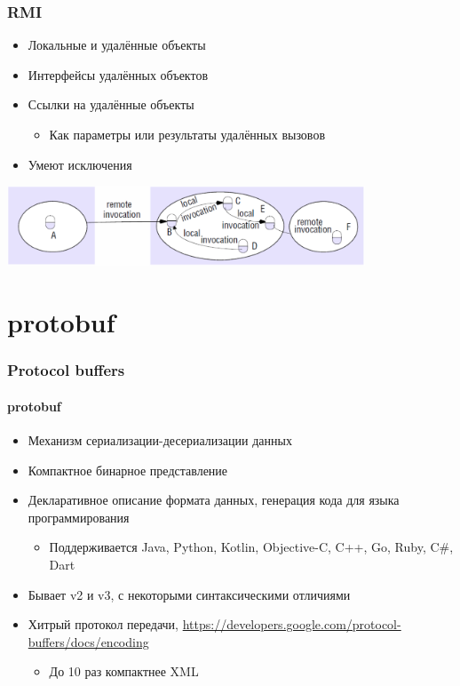 \documentclass[xetex,mathserif,serif]{beamer}
\begin{document}
    \begin{frame}
        \frametitle{RMI}
        \begin{itemize}
            \item Локальные и удалённые объекты
            \item Интерфейсы удалённых объектов
            \item Ссылки на удалённые объекты
            \begin{itemize}
                \item Как параметры или результаты удалённых вызовов
            \end{itemize}
            \item Умеют исключения
        \end{itemize}
        \begin{center}
            \includegraphics[width=0.8\textwidth]{remoteCalls.png}
        \end{center}
    \end{frame}

    \section{protobuf}

    \begin{frame}
        \frametitle{Protocol buffers}
        \framesubtitle{protobuf}
        \begin{itemize}
            \item Механизм сериализации-десериализации данных
            \item Компактное бинарное представление
            \item Декларативное описание формата данных, генерация кода для языка программирования
            \begin{itemize}
                \item Поддерживается Java, Python, Kotlin, Objective-C, C++, Go, Ruby, C\#, Dart
            \end{itemize}
            \item Бывает v2 и v3, с некоторыми синтаксическими отличиями
            \item Хитрый протокол передачи, \url{https://developers.google.com/protocol-buffers/docs/encoding}
            \begin{itemize}
                \item До 10 раз компактнее XML 
            \end{itemize}
        \end{itemize}
    \end{frame}
\end{document}
